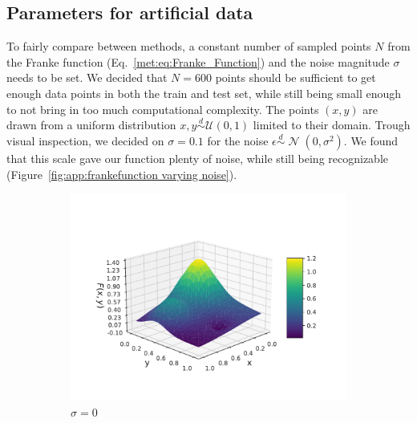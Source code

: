 \documentclass[twocolumn,english,notitlepage]{article}
\newcommand{\pclosed}[1]{\left(#1\right)}
\newcommand{\normal}[2]{\operatorname{\mathcal{N}}\pclosed{#1,#2}}
\newcommand{\distas}{\overset{d}{\sim}}
\begin{document}
\begin{appendices}
    \section{Parameters for artificial data} \label{app:sec:frankefunction N and sigma}
        To fairly compare between methods, a constant number of sampled points $N$ from the Franke function (Eq.~\ref{met:eq:Franke_Function}) and the noise magnitude $\sigma$ needs to be set. We decided that $N = 600$ points should be sufficient to get enough data points in both the train and test set, while still being small enough to not bring in too much computational complexity. The points $(x,y)$ are drawn from a uniform distribution $x,y \distas \mathcal{U}(0,1)$ limited to their domain. Trough visual inspection, we decided on $\sigma = 0.1$ for the noise $\epsilon \distas \normal{0}{\sigma^2}$. We found that this scale gave our function plenty of noise, while still being recognizable (Figure~\ref{fig:app:frankefunction varying noise}).   
        \begin{figure}
            \begin{subfigure}{.5\textwidth}
                \centering
                \includegraphics[width=\linewidth]{franke_functions_0.pdf}
                \caption{$\sigma = 0$}
                \end{subfigure}
            \hfill
            \begin{subfigure}{.5\textwidth}
                \centering

\end{subfigure}
\end{figure}
\end{appendices}
\end{document}
